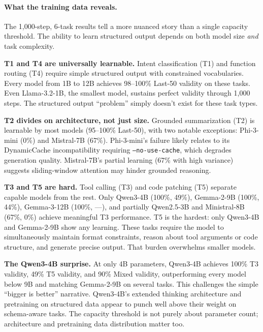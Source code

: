 \documentclass[11pt]{article}
\begin{document}
\paragraph{What the training data reveals.}

The 1{,}000-step, 6-task results tell a more nuanced story than a single capacity threshold.  The ability to learn structured output depends on both model size \emph{and} task complexity.

\textbf{T1 and T4 are universally learnable.} Intent classification (T1) and function routing (T4) require simple structured output with constrained vocabularies.  Every model from 1B to 12B achieves 98--100\% Last-50 validity on these tasks.  Even Llama-3.2-1B, the smallest model, sustains perfect validity through 1{,}000 steps.  The structured output ``problem'' simply doesn't exist for these task types.

\textbf{T2 divides on architecture, not just size.} Grounded summarization (T2) is learnable by most models (95--100\% Last-50), with two notable exceptions: Phi-3-mini (0\%) and Mistral-7B (67\%).  Phi-3-mini's failure likely relates to its DynamicCache incompatibility requiring \texttt{--no-use-cache}, which degrades generation quality.  Mistral-7B's partial learning (67\% with high variance) suggests sliding-window attention may hinder grounded reasoning.

\textbf{T3 and T5 are hard.} Tool calling (T3) and code patching (T5) separate capable models from the rest.  Only Qwen3-4B (100\%, 49\%), Gemma-2-9B (100\%, 44\%), Gemma-3-12B (100\%, ---), and partially Qwen2.5-3B and Ministral-8B (67\%, 0\%) achieve meaningful T3 performance.  T5 is the hardest: only Qwen3-4B and Gemma-2-9B show any learning.  These tasks require the model to simultaneously maintain format constraints, reason about tool arguments or code structure, and generate precise output.  That burden overwhelms smaller models.

\textbf{The Qwen3-4B surprise.} At only 4B parameters, Qwen3-4B achieves 100\% T3 validity, 49\% T5 validity, and 90\% Mixed validity, outperforming every model below 9B and matching Gemma-2-9B on several tasks.  This challenges the simple ``bigger is better'' narrative.  Qwen3-4B's extended thinking architecture and pretraining on structured data appear to punch well above their weight on schema-aware tasks.  The capacity threshold is not purely about parameter count; architecture and pretraining data distribution matter too.
\end{document}
